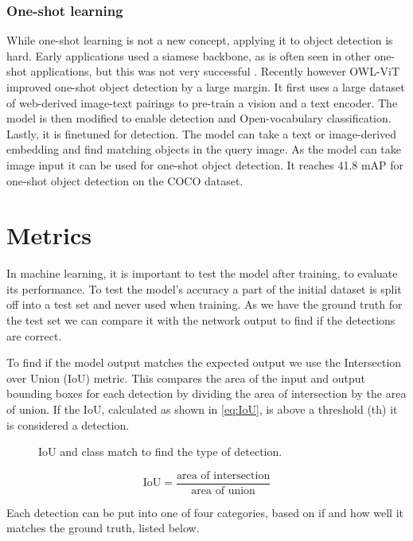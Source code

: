 \subsubsection*{One-shot learning}

While one-shot learning is not a new concept, applying it to object detection is hard. Early applications used a siamese backbone, as is often seen in other one-shot applications, but this was not very successful \citep{One-shot-siamese}. Recently however OWL-ViT\citep{owlvit} improved one-shot object detection by a large margin. It first uses a large dataset of web-derived image-text pairings to pre-train a vision and a text encoder. The model is then modified to enable detection and Open-vocabulary classification. Lastly, it is finetuned for detection. The model can take a text or image-derived embedding and find matching objects in the query image. As the model can take image input it can be used for one-shot object detection. It reaches 41.8 mAP for one-shot object detection on the COCO dataset. %


\section{Metrics}
In machine learning, it is important to test the model after training, to evaluate its performance. To test the model's accuracy a part of the initial dataset is split off into a test set and never used when training. As we have the ground truth for the test set we can compare it with the network output to find if the detections are correct. 

To find if the model output matches the expected output we use the Intersection over Union (IoU) metric. This compares the area of the input and output bounding boxes for each detection by dividing the area of intersection by the area of union. If the IoU, calculated as shown in \ref{eq:IoU}, is above a threshold (th) it is considered a detection.

\begin{figure}[h]
	\centering
	
	\caption{\label{fig:2_IoU_det} IoU and class match to find the type of detection.}
\end{figure}

\begin{equation}
	\text{IoU} = \frac{\text{area of intersection}}{\text{area of union}}
	\label{eq:IoU}
\end{equation}

Each detection can be put into one of four categories, based on if and how well it matches the ground truth, listed below.

